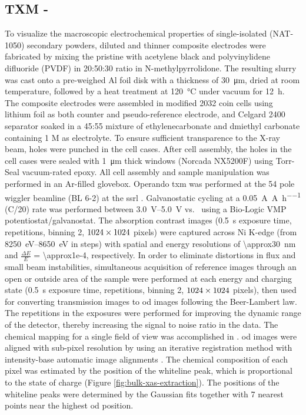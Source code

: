 \documentclass{article}
\begin{document}
\subsection*{TXM - \nca{}}

To visualize the macroscopic electrochemical properties of
single-isolated \nca{} (NAT-1050) secondary powders, diluted and
thinner composite electrodes were fabricated by mixing the pristine
\nca{} with acetylene black and polyvinylidene difluoride (PVDF) in
20:50:30 ratio in N-methylpyrrolidone. The resulting slurry was cast
onto a pre-weighed Al foil disk with a thickness of
\SI{30}{\micro\meter}, dried at room temperature, followed by a heat
treatment at \SI{120}{\celsius} under vacuum for \SI{12}{\hour}. The
composite electrodes were assembled in  modified
2032 coin cells using lithium foil as both counter and
pseudo-reference electrode, and Celgard 2400 separator soaked in a
45:55 mixture of ethylenecarbonate and dmiethyl carbonate containing 1
M  as electrolyte. To ensure sufficient transparence to the
X-ray beam, holes were punched in the cell cases. After cell assembly,
the holes in the cell cases were sealed with \SI{1}{\micro\meter}
thick  windows (Norcada NX5200F) using Torr-Seal
vacuum-rated epoxy. All cell assembly and sample manipulation was
performed in an Ar-filled glovebox. Operando \gls{txm} was performed
at the 54 pole wiggler beamline (BL 6-2) at the \gls{ssrl}
\cite{yun2008}. Galvanostatic cycling at a
\SI{0.05}{\ampere\per\ampere\per\hour} (C/20) rate was performed
between \SIrange{3.0}{5.0}{\volt} vs.\  using a Bio-Logic
VMP potentiostat/galvanostat. The absorption contrast images
(\SI{0.5}{\second} exposure time,  repetitions,
binning 2, $\rm 1024\times 1024$ pixels) were captured across Ni
K-edge (from \SIrange{8250}{8650}{\electronvolt} in  steps) with spatial and energy resolutions of
\SI{\approx30}{\nano\meter} and $\frac{\Delta E}{E}$ =
\num{\approx1e-4}, respectively. In order to eliminate distortions in
flux and small beam instabilities, simultaneous acquisition of
reference images through an open or outside area of the sample were
performed at each energy and charging state (\SI{0.5}{\second}
exposure time,  repetitions, binning 2, $\rm 1024
\times 1024$ pixels), then used for converting transmission images to
\gls{od} images following the Beer-Lambert law. The repetitions in the
exposures were performed for improving the dynamic range of the
detector, thereby increasing the signal to noise ratio in the
data. The chemical mapping for a single field of view was accomplished
in . \Gls{od} images were aligned with
sub-pixel resolution by using an iterative registration method with
intensity-base automatic image alignments \cite{lee2019-3}. The
chemical composition of each pixel was estimated by the position of
the whiteline peak, which is proportional to the state of charge
(Figure \ref{fig:bulk-xas-extraction}). The positions of the whiteline
peaks were determined by the Gaussian fits together with 7 nearest
points near the highest \gls{od} position.
\end{document}

